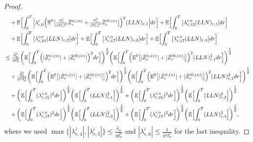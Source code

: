 \documentclass[10pt,a4paper]{article}
\theoremstyle{plain}
\theoremstyle{definition}
\numberwithin{equation}{section}
\begin{document}
\begin{proof}
\begin{align}
&\ \ \ +\mathbb{E}\Bigl[\int_{0}^{T}\Big|\lambda_{r,6}^{i}\Bigl(\mathbb{E}^{0}\bigl[\tfrac{\sigma_{r}^{i}}{(\bar{\sigma}_{r}^{i})^{2}}\bar{Z}_{r}^{ii,(n)}+\tfrac{\sigma_{r}^{0}}{(\bar{\sigma}_{r}^{i})^{2}}\bar{Z}_{r}^{i0,(n)}\bigr]\Bigr)^{2}(LLN)_{r,1}\Big|dr\Bigr] + \mathbb{E}\Bigl[\int_{0}^{T}\big|\lambda_{r,15}^{i,n}(LLN)_{r,1}\big|dr\Bigr] \nonumber \\
&\ \ \ + \mathbb{E}\Bigl[\int_{0}^{T}\big|\lambda_{r,16}^{i,n}(LLN)_{r,2}\big|dr\Bigr] +\mathbb{E}\Bigl[\int_{0}^{T}\big|\lambda_{r,17}^{i,n}(LLN)_{r,3}\big|dr\Bigr] + \mathbb{E}\Bigl[\int_{0}^{T}\big|\lambda_{r,17}^{i,n}(LLN)_{r,4}\big|dr\Bigr] \nonumber \\
&\leq \tfrac{\bar{\delta}_{\sigma}^{2}}{\eta\delta_{\sigma}^{6}}\biggl(\mathbb{E}\Bigl[\int_{0}^{T}\Bigl(|\bar{Z}_{r}^{ii,(n)}| + |\bar{Z}_{r}^{i0,(n)}|\Bigr)^{2}dr\Bigr]\biggr)^{\tfrac{1}{2}}\biggl(\mathbb{E}\Bigl[\int_{0}^{T}\Bigl(\mathbb{E}^{0}\bigl[|\bar{Z}_{r}^{ii,(n)}|+|\bar{Z}_{r}^{i0,(n)}|\bigr]\Bigr)^{2}(LLN)_{r,1}^{2}dr\Bigr]\biggr)^{\tfrac{1}{2}} \nonumber \\
&\ \ \ +\tfrac{\bar{\delta}_{\sigma}^{2}}{\eta^{2}\delta_{\sigma}^{9}}\biggl(\mathbb{E}\Bigl[\int_{0}^{T}\Bigl(\mathbb{E}^{0}\bigl[|\bar{Z}_{r}^{ii,(n)}|+|\bar{Z}_{r}^{i0,(n)}|\bigr]\Bigr)^{2}dr\Bigr]\biggr)^{\tfrac{1}{2}}\biggl(\mathbb{E}\Bigl[\int_{0}^{T}\Bigl(\mathbb{E}^{0}\bigl[|\bar{Z}_{r}^{ii,(n)}|+|\bar{Z}_{r}^{i0,(n)}|\bigr]\Bigr)^{2}(LLN)_{r,1}^{2}dr\Bigr]\biggr)^{\tfrac{1}{2}} \nonumber \\
&\ \ \ +\biggl(\mathbb{E}\Bigl[\int_{0}^{T}(\lambda_{r,15}^{i,n})^{2}dr\Bigr]\biggr)^{\tfrac{1}{2}}\biggl(\mathbb{E}\Bigl[\int_{0}^{T}(LLN)_{r,1}^{2}\Bigr]\biggr)^{\tfrac{1}{2}} + \biggl(\mathbb{E}\Bigl[\int_{0}^{T}(\lambda_{r,16}^{i,n})^{2}dr\Bigr]\biggr)^{\tfrac{1}{2}}\biggl(\mathbb{E}\Bigl[\int_{0}^{T}(LLN)_{r,2}^{2}\Bigr]\biggr)^{\tfrac{1}{2}} \nonumber \\
&\ \ \ + \biggl(\mathbb{E}\Bigl[\int_{0}^{T}(\lambda_{r,17}^{i,n})^{2}dr\Bigr]\biggr)^{\tfrac{1}{2}}\biggl(\mathbb{E}\Bigl[\int_{0}^{T}(LLN)_{r,3}^{2}\Bigr]\biggr)^{\tfrac{1}{2}} + \biggl(\mathbb{E}\Bigl[\int_{0}^{T}(\lambda_{r,17}^{i,n})^{2}dr\Bigr]\biggr)^{\tfrac{1}{2}}\biggl(\mathbb{E}\Bigl[\int_{0}^{T}(LLN)_{r,4}^{2}\Bigr]\biggr)^{\tfrac{1}{2}}, \label{equ:5.13}
\end{align}
where we used $\max\{|\lambda_{r,4}^{i}|,|\lambda_{r,5}^{i}|\} \leq \tfrac{\bar{\delta}_{\sigma}}{\eta\delta_{\sigma}^{4}}$ and $|\lambda_{r,6}^{i}| \leq \tfrac{1}{\eta^{2}\delta_{\sigma}^{5}}$ for the last inequality.

\end{proof}
\end{document}
